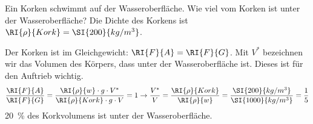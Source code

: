 \begin{aufgabe}
	Ein Korken schwimmt auf der Wasseroberfläche. Wie viel vom Korken ist unter der Wasseroberfläche?
	Die Dichte des Korkens ist $\RI{\rho}{Kork}=\SI{200}{kg/m^3}$.


	\begin{loesung}
		Der Korken ist im Gleichgewicht: $\RI{F}{A}=\RI{F}{G}$.
		Mit $V^*$ bezeichnen wir das Volumen des Körpers, dass unter der Wasseroberfläche ist.
		Dieses ist für den Auftrieb wichtig.
		\begin{eqnarray*}
			\frac{\RI{F}{A}}{\RI{F}{G}} = \frac{\RI{\rho}{w}\cdot g\cdot V^*}{\RI{\rho}{Kork}\cdot g\cdot V}=1\to\frac{V^*}{V}=\frac{\RI{\rho}{Kork}}{\RI{\rho}{w}}=\frac{\SI{200}{kg/m^3}}{\SI{1000}{kg/m^3}}=\frac{1}{5}
		\end{eqnarray*}
		\SI{20}{\%} des Korkvolumens ist unter der Wasseroberfläche.
	\end{loesung}

\end{aufgabe}



